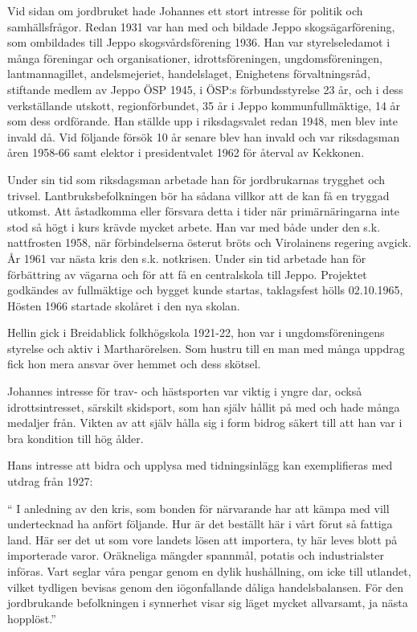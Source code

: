 Vid sidan om jordbruket hade Johannes ett stort intresse för politik och samhällsfrågor. Redan 1931 var han med och bildade Jeppo skogsägarförening, som ombildades till Jeppo skogsvårdsförening 1936. Han var styrelseledamot i många föreningar och organisationer, idrottsföreningen, ungdomsföreningen, lantmannagillet, andelsmejeriet, handelslaget, Enighetens förvaltningsråd, stiftande medlem av Jeppo ÖSP 1945, i ÖSP:s förbundsstyrelse 23 år, och i dess verkställande utskott, regionförbundet, 35 år i Jeppo kommunfullmäktige, 14 år som dess ordförande. Han ställde upp i riksdagsvalet redan 1948, men blev inte invald då. Vid följande försök 10 år senare blev han invald och var riksdagsman åren 1958-66 samt elektor i presidentvalet 1962 för återval av Kekkonen.


Under sin tid som riksdagsman arbetade han för jordbrukarnas trygghet och trivsel. Lantbruksbefolkningen bör ha sådana villkor att de kan få en tryggad utkomst. Att åstadkomma eller försvara detta i tider när primärnäringarna inte stod så högt i kurs krävde mycket arbete. Han var med både under den s.k. nattfrosten 1958, när förbindelserna österut bröts och Virolainens regering avgick. År 1961 var nästa kris den s.k. notkrisen. Under sin tid arbetade han för förbättring av vägarna och för att få en centralskola till Jeppo. Projektet godkändes av fullmäktige och bygget kunde startas, taklagsfest hölls 02.10.1965, Hösten 1966 startade skolåret i den nya skolan.

Hellin gick i Breidablick folkhögskola 1921-22, hon  var i ungdomsföreningens styrelse och aktiv i Martharörelsen. Som hustru till en man med många uppdrag fick hon mera ansvar över hemmet och dess skötsel.

Johannes intresse för trav- och hästsporten var viktig i yngre dar, också idrottsintresset, särskilt skidsport, som han själv hållit på med och hade många medaljer från. Vikten av att själv hålla sig i form bidrog säkert till att han var i bra kondition till hög ålder.

Hans intresse att bidra och upplysa med tidningsinlägg kan exemplifieras med utdrag från 1927:

`` I anledning av den kris, som bonden för närvarande har att kämpa med vill undertecknad ha anfört följande. Hur är det beställt här i vårt förut så fattiga land. Här ser det ut som vore landets lösen att importera, ty här leves blott på importerade varor. Oräkneliga mängder spannmål, potatis och industrialster införas. Vart seglar våra pengar genom en dylik hushållning, om icke till utlandet, vilket tydligen bevisas genom den iögonfallande dåliga handelsbalansen.
För den jordbrukande befolkningen i synnerhet visar sig läget mycket allvarsamt, ja nästa hopplöst.''



